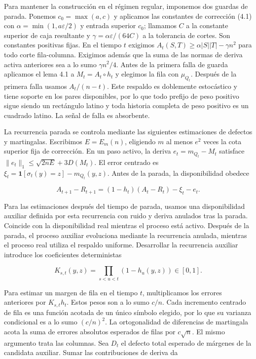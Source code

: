 \documentclass[spanish,11pt,a4paper]{article}
\begin{document}
Para mantener la construcción en el régimen regular, imponemos dos guardas de parada. Ponemos \(c_0=\max(a,c)\) y aplicamos las constantes de corrección (4.1) con \(\alpha=\min(1,a\varepsilon/2)\) y entrada superior \(c_0\); llamamos \(C\) a la constante superior de caja resultante y \(\gamma=\alpha\varepsilon/(64C)\) a la tolerancia de cortes. Son constantes positivas fijas. En el tiempo \(t\) exigimos \(A_t(S,T)\ge\alpha|S||T|-\gamma n^2\) para todo corte fila-columna. Exigimos además que la suma de las normas de deriva activa anteriores sea a lo sumo \(\gamma n^2/4\). Antes de la primera falla de guarda aplicamos el lema 4.1 a \(M_t=A_t\circ h_t\) y elegimos la fila con \(\mu_{Q_t}\). Después de la primera falla usamos \(A_t/(n-t)\). Este respaldo es doblemente estocástico y tiene soporte en los pares disponibles, por lo que todo prefijo de peso positivo sigue siendo un rectángulo latino y toda historia completa de peso positivo es un cuadrado latino. La señal de falla es absorbente.

La recurrencia parada se controla mediante las siguientes estimaciones de defectos y martingalas. Escribimos \(E=E_m(n)\), eligiendo \(m\) al menos \(e^2\) veces la cota superior fija de corrección. En un paso activo, la deriva \(e_t=m_{Q_t}-M_t\) satisface \(\|e_t\|_1\le\sqrt{2nE}+3D(M_t)\). El error centrado es \(\xi_t=\mathbf1[\sigma_t(y)=z]-m_{Q_t}(y,z)\). Antes de la parada, la disponibilidad obedece

\nopagebreak[4]
\[A_{t+1}-R_{t+1}=(1-h_t)(A_t-R_t)-\xi_t-e_t.\tag{6.2}\]

Para las estimaciones después del tiempo de parada, usamos una disponibilidad auxiliar definida por esta recurrencia con ruido y deriva anulados tras la parada. Coincide con la disponibilidad real mientras el proceso está activo. Después de la parada, el proceso auxiliar evoluciona mediante la recurrencia anulada, mientras el proceso real utiliza el respaldo uniforme. Desarrollar la recurrencia auxiliar introduce los coeficientes deterministas

\nopagebreak[4]
\[K_{s,t}(y,z)=\prod_{s<u<t}(1-h_u(y,z))\in[0,1].\tag{6.3}\]

Para estimar un margen de fila en el tiempo \(t\), multiplicamos los errores anteriores por \(K_{s,t}h_t\). Estos pesos son a lo sumo \(c/n\). Cada incremento centrado de fila es una función acotada de un único símbolo elegido, por lo que su varianza condicional es a lo sumo \((c/n)^2\). La ortogonalidad de diferencias de martingala acota la suma de errores absolutos esperados de filas por \(c\sqrt n\). El mismo argumento trata las columnas. Sea \(D_t\) el defecto total esperado de márgenes de la candidata auxiliar. Sumar las contribuciones de deriva da
\end{document}
